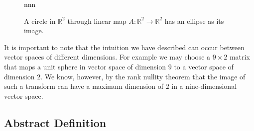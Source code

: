 \documentclass[12pt,reqno,twoside,titlepage]{article}
\theoremstyle{definition}
\begin{document}
\begin{figure}[htb]
nnn  \begin{centering}
  \end{centering}
  \caption{A circle in $\mathbb{R}^2$ through linear map $A:\mathbb{R}^2 \to \mathbb{R}^2$ has an ellipse as its image.}
  \label{fig:svd:1}
\end{figure}

It is important to note that the intuition we have described can occur between vector spaces of different dimensions.
For example we may choose a $9 \times 2$ matrix that maps a unit sphere in vector space of dimension $9$ to a vector space of dimension $2$.
We know, however, by the rank nullity theorem that the image of such a transform can have a maximum dimension of $2$ in a nine-dimensional vector space.

\subsection{Abstract Definition}
\cite{trefethen97}
\label{sec:svd:2}
\end{document}
